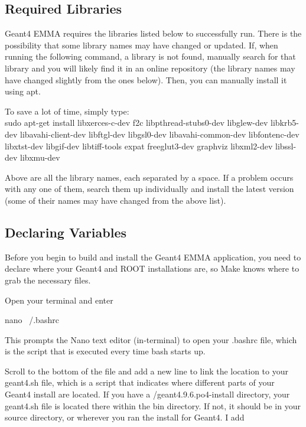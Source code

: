 \documentclass{article}
\newcommand{\filefont}[1]{{\fontfamily{pnc}\selectfont #1}\xspace}
\begin{document}
\subsection{Required Libraries}

Geant4 EMMA requires the libraries listed below to successfully run. There is the possibility that some library names may have changed or updated. If, when running the following command, a library is not found, manually search for that library and you will likely find it in an online repository (the library names may have changed slightly from the ones below). Then, you can manually install it using \filefont{apt}. 

To save a lot of time, simply type: \\
\filefont{sudo apt-get install libxerces-c-dev f2c libpthread-stubs0-dev libglew-dev libkrb5-dev libavahi-client-dev libftgl-dev libgsl0-dev libavahi-common-dev libfontenc-dev libxtst-dev libgif-dev libtiff-tools expat freeglut3-dev graphviz libxml2-dev libssl-dev libxmu-dev}

Above are all the library names, each separated by a space. If a problem occurs with any one of them, search them up individually and install the latest version (some of their names may have changed from the above list).

\subsection{Declaring Variables}

Before you begin to build and install the Geant4 EMMA application, you need to declare where your Geant4 and ROOT installations are, so Make knows where to grab the necessary files. 

Open your terminal and enter 

\filefont{nano ~/.bashrc}

This prompts the Nano text editor (in-terminal) to open your \filefont{.bashrc} file, which is the script that is executed every time bash starts up. 

Scroll to the bottom of the file and add a new line to link the location to your \filefont{geant4.sh} file, which is a script that indicates where different parts of your Geant4 install are located. If you have a \filefont{[path to]/geant4.9.6.po4-install} directory, your \filefont{geant4.sh} file is located there within the \filefont{bin} directory. If not, it should be in your source directory, or wherever you ran the install for Geant4. I add
\end{document}
